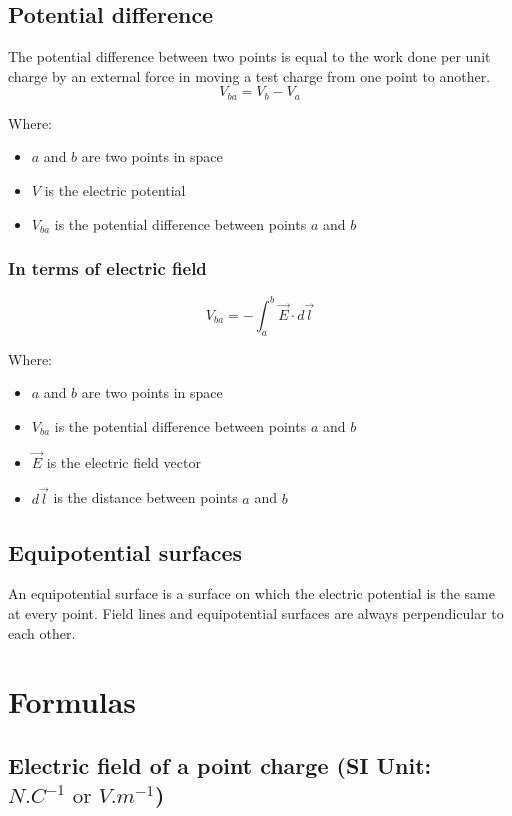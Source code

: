 \documentclass[11pt]{article}
\begin{document}
\newpage
\subsection{Potential difference}
\label{sec:org4252202}
The potential difference between two points is equal to the work done per unit charge by an external force in moving a test charge from one point to another.
\[V_{ba} = V_{b} - V_{a}\]

Where:
\begin{itemize}
\item \(a\) and \(b\) are two points in space
\item \(V\) is the electric potential
\item \(V_{ba}\) is the potential difference between points \(a\) and \(b\)
\end{itemize}
\subsubsection{In terms of electric field}
\label{sec:orgbaf5962}
\[V_{ba} = - \int_a^b \vec{E} \cdot d \vec{l}\]

Where:
\begin{itemize}
\item \(a\) and \(b\) are two points in space
\item \(V_{ba}\) is the potential difference between points \(a\) and \(b\)
\item \(\vec{E}\) is the electric field vector
\item \(d \vec{l}\) is the distance between points \(a\) and \(b\)
\end{itemize}
\subsection{Equipotential surfaces}
\label{sec:org88691a0}
An equipotential surface is a surface on which the electric potential is the same at every point. Field lines and equipotential surfaces are always perpendicular to each other.

\newpage
\section{Formulas}
\label{sec:orgb819370}

\subsection{Electric field of a point charge (SI Unit: \(\unit{N.C^{-1}} \text{ or } \unit{V.m^{-1}}\))}
\label{sec:org9e7f8eb}
\end{document}
